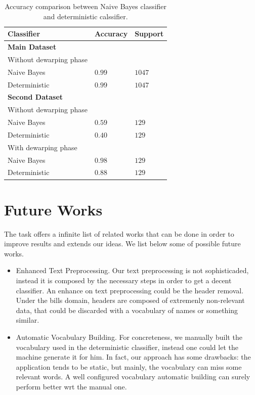 \documentclass[10pt,twocolumn,letterpaper]{article}
\begin{document}
\begin{table}[!h]
  \begin{center}
    \begin{tabular}{lll}
      \hline
      Classifier & Accuracy & Support \\ \hline
      \textbf{Main Dataset} \\
      \small Without dewarping phase\\
      \; \; Naive Bayes & $0.99$ & $1047$ \\
      \; \; Deterministic & $0.99$ & $1047$ \\ \hline
      
      \textbf{Second Dataset} & & \\
      \small Without dewarping phase \\
      \; \; Naive Bayes & $0.59$ & $129$ \\
      \; \; Deterministic & $0.40$ & $129$ \\ 
      
      \small With dewarping phase \\
      \; \; Naive Bayes & $0.98$ & $129$ \\
      \; \; Deterministic & $0.88$ & $129$ \\ \hline
    \end{tabular}
  \end{center}
  \label{table:classifiers-comparison}
  \caption{Accuracy comparison between Naive Bayes classifier and
    deterministic calssifier.}
\end{table}

\section{Future Works}
\label{sec:future-works}

The task offers a infinite list of related works that can be done in
order to improve results and extends our ideas. We list below some of
possible future works.

\begin{itemize}
  \item Enhanced Text Preprocessing. Our text preprocessing is not
    sophisticaded, instead it is composed by the necessary steps in
    order to get a decent classifier. An enhance on text preprocessing
    could be the header removal. Under the bills domain, headers are
    composed of extremenly non-relevant data, that could be discarded
    with a vocabulary of names or something similar.
  \item Automatic Vocabulary Building. For concreteness, we manually
    built the vocabulary used in the deterministic classifier, instead
    one could let the machine generate it for him. In fact, our
    approach has some drawbacks: the application tends to be static,
    but mainly, the vocabulary can miss some relevant words. A well
    configured vocabulary automatic building can surely perform better
    wrt the manual one. 
\end{itemize}
\end{document}
